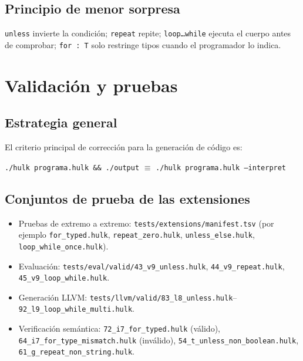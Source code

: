 \documentclass[11pt,a4paper]{article}
\begin{document}
\subsection{Principio de menor sorpresa}

\texttt{unless} invierte la condición; \texttt{repeat} repite; \texttt{loop\ldots while} ejecuta el cuerpo antes de comprobar; \texttt{for : T} solo restringe tipos cuando el programador lo indica.

\section{Validación y pruebas}

\subsection{Estrategia general}

El criterio principal de corrección para la generación de código es:

\begin{center}
\texttt{./hulk programa.hulk \&\& ./output} $\equiv$ \texttt{./hulk programa.hulk --interpret}
\end{center}

\subsection{Conjuntos de prueba de las extensiones}

\begin{itemize}
  \item Pruebas de extremo a extremo: \texttt{tests/extensions/manifest.tsv} (por ejemplo \texttt{for\_typed.hulk}, \texttt{repeat\_zero.hulk}, \texttt{unless\_else.hulk}, \texttt{loop\_while\_once.hulk}).
  \item Evaluación: \texttt{tests/eval/valid/43\_v9\_unless.hulk}, \texttt{44\_v9\_repeat.hulk}, \texttt{45\_v9\_loop\_while.hulk}.
  \item Generación LLVM: \texttt{tests/llvm/valid/83\_l8\_unless.hulk}--\texttt{92\_l9\_loop\_while\_multi.hulk}.
  \item Verificación semántica: \texttt{72\_i7\_for\_typed.hulk} (válido), \texttt{64\_i7\_for\_type\_mismatch.hulk} (inválido), \texttt{54\_t\_unless\_non\_boolean.hulk}, \texttt{61\_g\_repeat\_non\_string.hulk}.
\end{itemize}
\end{document}
